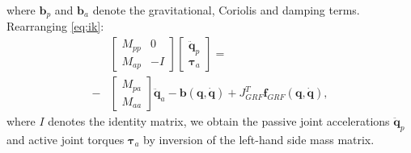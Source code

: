 \documentclass[letterpaper, 10 pt, conference]{ieeeconf}  %
\begin{document}
where $\mathbf{b}_p$ and $\mathbf{b}_a$ denote the gravitational, Coriolis and damping terms. 
Rearranging \eqref{eq:ik}:
\begin{equation}
	\begin{aligned}
		&\left[\begin{array}{cc}  
		M_{pp} & 0\\
		M_{ap} &-I
		\end{array} \right]
		\left[\begin{array}{c}  
		\mathbf{\ddot q}_p\\
		\boldsymbol{\tau}_a
		\end{array} \right] =\\ 
		-&
		\left[\begin{array}{c}  
		M_{pa}\\
		M_{aa}
		\end{array} \right] 
		\mathbf{\ddot q}_a-
		\mathbf{b(q, \dot q)}+
		J_{GRF}^T \mathbf{f}_{GRF}\mathbf{(q, \dot q)},
	\end{aligned}
\end{equation}	
where $I$ denotes the identity matrix, we obtain the passive joint accelerations $\mathbf{\ddot q}_p$ and active joint torques $\boldsymbol{\tau}_a$ by inversion of the left-hand side mass matrix.
\end{document}
